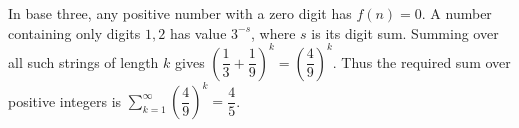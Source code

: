 In base three, any positive number with a zero digit has $f(n)=0$. A number containing only digits $1,2$ has value $3^{-s}$, where $s$ is its digit sum. Summing over all such strings of length $k$ gives $(\dfrac{1}{3}+\dfrac{1}{9})^k=(\dfrac{4}{9})^k$. Thus the required sum over positive integers is $\sum_{k=1}^{\infty}(\dfrac{4}{9})^k=\boxed{\dfrac{4}{5}}$.
